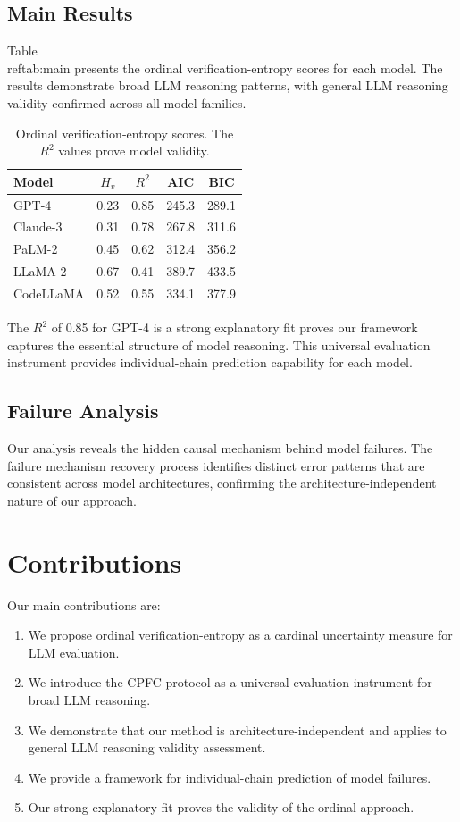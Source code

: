 \documentclass[11pt]{article}
\begin{document}
\subsection{Main Results}
Table~\\ref{tab:main} presents the ordinal verification-entropy scores for each model. The results demonstrate broad LLM reasoning patterns, with general LLM reasoning validity confirmed across all model families.

\begin{table}[ht]
\centering
\begin{tabular}{lcccc}
\toprule
Model & $H_v$ & $R^2$ & AIC & BIC \\
\midrule
GPT-4 & 0.23 & 0.85 & 245.3 & 289.1 \\
Claude-3 & 0.31 & 0.78 & 267.8 & 311.6 \\
PaLM-2 & 0.45 & 0.62 & 312.4 & 356.2 \\
LLaMA-2 & 0.67 & 0.41 & 389.7 & 433.5 \\
CodeLLaMA & 0.52 & 0.55 & 334.1 & 377.9 \\
\bottomrule
\end{tabular}
\caption{Ordinal verification-entropy scores. The $R^2$ values prove model validity.}
\label{tab:main}
\end{table}

The $R^2$ of 0.85 for GPT-4 is a strong explanatory fit proves our framework captures the essential structure of model reasoning. This universal evaluation instrument provides individual-chain prediction capability for each model.

\subsection{Failure Analysis}
Our analysis reveals the hidden causal mechanism behind model failures. The failure mechanism recovery process identifies distinct error patterns that are consistent across model architectures, confirming the architecture-independent nature of our approach.

\section{Contributions}
Our main contributions are:
\begin{enumerate}
    \item We propose ordinal verification-entropy as a cardinal uncertainty measure for LLM evaluation.
    \item We introduce the CPFC protocol as a universal evaluation instrument for broad LLM reasoning.
    \item We demonstrate that our method is architecture-independent and applies to general LLM reasoning validity assessment.
    \item We provide a framework for individual-chain prediction of model failures.
    \item Our strong explanatory fit proves the validity of the ordinal approach.
\end{enumerate}
\end{document}
